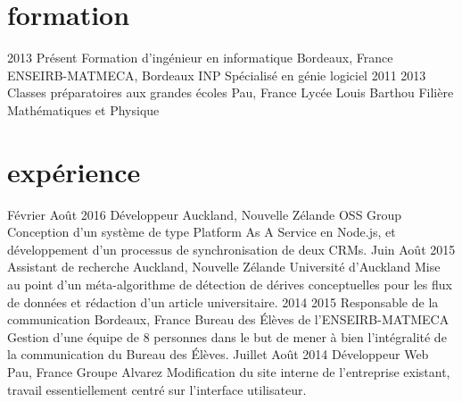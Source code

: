 \section{formation}
\begin{experiencelist}
\entry
    {2013}
    {Présent}
    {Formation d'ingénieur en informatique}
    {Bordeaux, France}
    {ENSEIRB-MATMECA, Bordeaux INP}
    {
        Spécialisé en génie logiciel 
    }
\entry
    {2011}
    {2013}
    {Classes préparatoires aux grandes écoles}
    {Pau, France}
    {Lycée Louis Barthou}
    {
        Filière Mathématiques et Physique
    }
\end{experiencelist}



\section{expérience}
\begin{experiencelist}
\entry
    {Février}
    {Août 2016}
    {Développeur}
    {Auckland, Nouvelle Zélande}
    {OSS Group}
    {
        Conception d'un système de type Platform As A Service en Node.js, et développement d'un processus de synchronisation de deux CRMs.
    }
\entry
    {Juin}
    {Août 2015}
    {Assistant de recherche}
    {Auckland, Nouvelle Zélande}
    {Université d'Auckland}
    {
        Mise au point d'un méta-algorithme de détection de dérives conceptuelles pour les flux de données et rédaction d'un article universitaire.
    }
\entry
    {2014}
    {2015}
    {Responsable de la communication}
    {Bordeaux, France}
    {Bureau des Élèves de l'ENSEIRB-MATMECA}
    {
        Gestion d'une équipe de 8 personnes dans le but de mener à bien l'intégralité de la communication du Bureau des Élèves.
    }
\entry
    {Juillet}
    {Août 2014}
    {Développeur Web}
    {Pau, France}
    {Groupe Alvarez}
    {
        Modification du site interne de l'entreprise existant, travail essentiellement centré sur l'interface utilisateur.
    }
\end{experiencelist}



